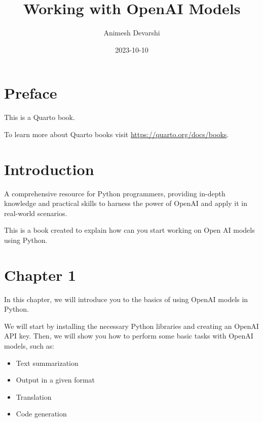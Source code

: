 \documentclass[
  letterpaper,
  DIV=11,
  numbers=noendperiod]{scrreprt}
\title{Working with OpenAI Models}
\author{Animesh Devarshi}
\date{2023-10-10}
\renewcommand*\contentsname{Table of contents}
\newcommand\contentsname{Table of contents}
\begin{document}
\maketitle
\ifdefined\Shaded\renewenvironment{Shaded}{\begin{tcolorbox}[boxrule=0pt, breakable, enhanced, sharp corners, interior hidden, borderline west={3pt}{0pt}{shadecolor}, frame hidden]}{\end{tcolorbox}}\fi

\renewcommand*\contentsname{Table of contents}
{
\hypersetup{linkcolor=}
\setcounter{tocdepth}{2}
\tableofcontents
}

\hypertarget{preface}{%
\chapter*{Preface}\label{preface}}


This is a Quarto book.

To learn more about Quarto books visit
\url{https://quarto.org/docs/books}.


\hypertarget{introduction}{%
\chapter{Introduction}\label{introduction}}

A comprehensive resource for Python programmers, providing in-depth
knowledge and practical skills to harness the power of OpenAI and apply
it in real-world scenarios.

This is a book created to explain how can you start working on Open AI
models using Python.


\hypertarget{chapter-1}{%
\chapter{Chapter 1}\label{chapter-1}}

In this chapter, we will introduce you to the basics of using OpenAI
models in Python.

We will start by installing the necessary Python libraries and creating
an OpenAI API key. Then, we will show you how to perform some basic
tasks with OpenAI models, such as:

\begin{itemize}
\item
  Text summarization
\item
  Output in a given format
\item
  Translation
\item
  Code generation
\end{itemize}
\end{document}

